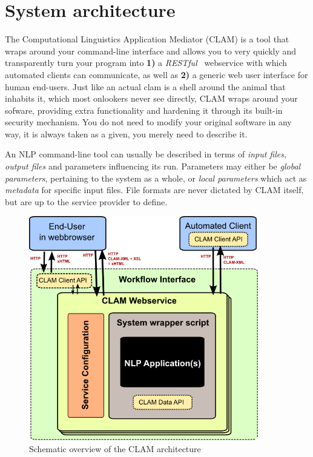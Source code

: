 \documentclass[11pt]{article}
\begin{document}
\section{System architecture}

The Computational Linguistics Application Mediator (CLAM) is a tool that wraps
around your command-line interface and allows you to very quickly and
transparently turn your program into \textbf{1)} a \emph{RESTful}~\cite{REST}
webservice with which automated clients can communicate, as well as \textbf{2)}
a generic web user interface for human end-users. Just like an actual clam is a
shell around the animal that inhabits it, which most onlookers never see
directly, CLAM wraps around your sofware, providing extra functionality and
hardening it through its built-in security mechanism. You do not need to modify
your original software in any way, it is always taken as a given, you merely
need to describe it. 

An NLP command-line tool can usually be described in terms of \emph{input
files}, \emph{output files} and parameters influencing its run. Parameters may
either be \emph{global parameters}, pertaining to the system as a whole, or
\emph{local parameters} which act as \emph{metadata} for specific input files. File
formats are never dictated by CLAM itself, but are up to the service provider
to define.

\begin{figure}[htb]
\begin{center}
\includegraphics[width=100.0mm]{architecture.png}
\end{center}
\caption{Schematic overview of the CLAM architecture}
\label{fig:arch} 
\end{figure}
\end{document}
